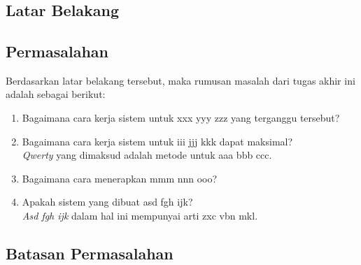 \chapter{\babSatu}
\section{Latar Belakang}


\section{Permasalahan}

Berdasarkan latar belakang tersebut, maka rumusan masalah dari tugas akhir ini adalah sebagai berikut:
\begin{enumerate}
\item Bagaimana cara kerja sistem untuk xxx yyy zzz yang terganggu tersebut?
\item Bagaimana cara kerja sistem untuk iii jjj kkk dapat maksimal?\\
\textit{Qwerty} yang dimaksud adalah metode untuk aaa bbb ccc.
\item Bagaimana cara menerapkan mmm nnn ooo?
\item Apakah sistem yang dibuat asd fgh ijk?\\
\textit{Asd fgh ijk} dalam hal ini mempunyai arti zxc vbn mkl.
\end{enumerate}

\section{Batasan Permasalahan}

